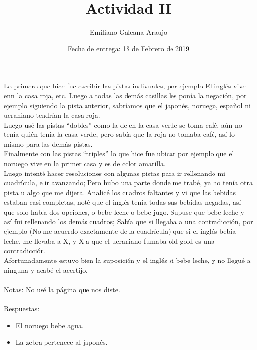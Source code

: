 \documentclass[spanish,12pt,letterpaper]{article}
\title{Actividad II}
\author{Emiliano Galeana Araujo}
\affil{Facultad de Ciencias, UNAM}
\date{Fecha de entrega: 18 de Febrero de 2019}
\begin{document}
\maketitle

Lo primero que hice fue escribir las pistas indivuales, por ejemplo El inglés
vive enn la casa roja, etc. Luego a todas las demás casillas les ponía la
negación, por ejemplo siguiendo la pista anterior, sabríamos que el japonés,
noruego, español ni ucraniano tendrían la casa roja.\\
Luego usé las pistas ``dobles'' como la de en la casa verde se toma café, aún no
tenía quién tenía la casa verde, pero sabía que la roja no tomaba café, así lo
mismo para las demás pistas.\\
Finalmente con las pistas ``triples'' lo que hice fue ubicar por ejemplo que el
noruego vive en la primer casa y es de color amarilla.\\
Luego intenté hacer resoluciones con algunas pistas para ir rellenando mi
cuadrícula, e ir avanzando; Pero hubo una parte donde me trabé, ya no tenía otra
pista u algo que me dijera. Analicé los cuadros faltantes y vi que las bebidas
estaban casi completas, noté que el inglés tenía todas sus bebidas negadas, así
que solo había dos opciones, o bebe leche o bebe jugo. Supuse que bebe leche y
así fui rellenando los demás cuadros; Sabía que si llegaba a una contradicción,
por ejemplo (No me acuerdo exactamente de la cuadrícula) que si el inglés bebía
leche, me llevaba a X, y X a que el ucraniano fumaba old gold es una
contradicción.\\
Afortunadamente estuvo bien la suposición y el inglés si bebe leche, y no llegué
a ninguna y acabé el acertijo.\\\\
Notas: No usé la página que nos diste.\\\\
Respuestas:\\
\begin{itemize}
\item El noruego bebe agua.
\item La zebra pertenece al japonés.
\end{itemize}
\end{document}
